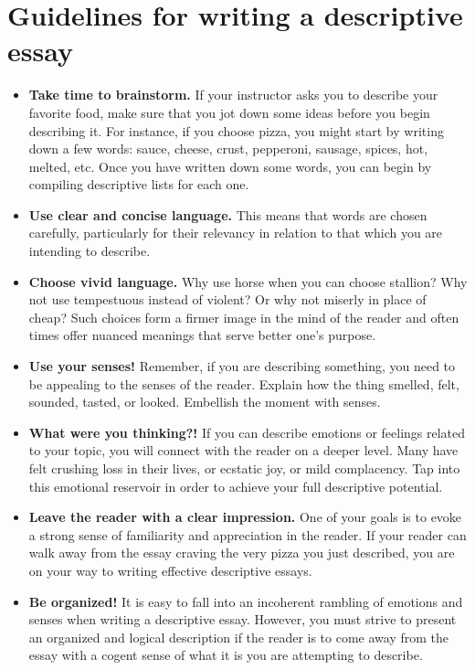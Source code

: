 \section{Guidelines for writing a descriptive essay}
	\begin{itemize}
		\item \textbf{Take time to brainstorm.} If your instructor asks you to describe your favorite food, make sure that you jot down some ideas before you begin describing it. For instance, if you choose pizza, you might start by writing down a few words: sauce, cheese, crust, pepperoni, sausage, spices, hot, melted, etc. Once you have written down some words, you can begin by compiling descriptive lists for each one.
		
		\item \textbf{Use clear and concise language.} This means that words are chosen carefully, particularly for their relevancy in relation to that which you are intending to describe.
		
		\item \textbf{Choose vivid language.} Why use horse when you can choose stallion? Why not use tempestuous instead of violent? Or why not miserly in place of cheap? Such choices form a firmer image in the mind of the reader and often times offer nuanced meanings that serve better one’s purpose.
		
		\item \textbf{Use your senses!} Remember, if you are describing something, you need to be appealing to the senses of the reader. Explain how the thing smelled, felt, sounded, tasted, or looked. Embellish the moment with senses.
		
		\item \textbf{What were you thinking?!} If you can describe emotions or feelings related to your topic, you will connect with the reader on a deeper level. Many have felt crushing loss in their lives, or ecstatic joy, or mild complacency. Tap into this emotional reservoir in order to achieve your full descriptive potential.
		
		\item \textbf{Leave the reader with a clear impression.} One of your goals is to evoke a strong sense of familiarity and appreciation in the reader. If your reader can walk away from the essay craving the very pizza you just described, you are on your way to writing effective descriptive essays.
		
		\item \textbf{Be organized!} It is easy to fall into an incoherent rambling of emotions and senses when writing a descriptive essay. However, you must strive to present an organized and logical description if the reader is to come away from the essay with a cogent sense of what it is you are attempting to describe.
	\end{itemize}

